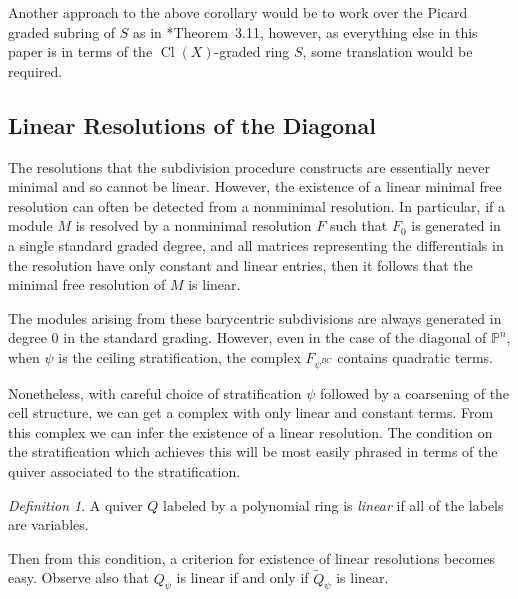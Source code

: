 \documentclass{amsart}
\DeclareMathOperator{\Cl}{Cl}
\theoremstyle{remark}
\newtheorem{definition}[theorem]{Definition}
\begin{document}
Another approach to the above corollary would be to work over the Picard graded subring of $S$ as in \cite{cox-paper}*{Theorem~3.11}, however, as everything else in this paper is in terms of the $\Cl(X)$-graded ring $S$, some translation would be required.

\subsection*{Linear Resolutions of the Diagonal}

The resolutions that the subdivision procedure constructs are essentially never minimal and so cannot be linear.
However, the existence of a linear minimal free resolution can often be detected from a nonminimal resolution.
In particular, if a module $M$ is resolved by a nonminimal resolution $F$ such that $F_0$ is generated in a single standard graded degree,
and all matrices representing the differentials in the resolution have only constant and linear entries,
then it follows that the minimal free resolution of $M$ is linear.

The modules arising from these barycentric subdivisions are always generated in degree $0$ in the standard grading.
However, even in the case of the diagonal of $\mathbb{P}^n$, when $\psi$ is the ceiling stratification, the complex $F_{\psi^{BC}}$ contains quadratic terms.

Nonetheless, with careful choice of stratification $\psi$ followed by a coarsening of the cell structure, we can get a complex with only linear and constant terms.
From this complex we can infer the existence of a linear resolution. The condition on the stratification which achieves this will be most easily phrased in terms of the quiver associated to the stratification.

\begin{definition}
  A quiver $Q$ labeled by a polynomial ring is \emph{linear} if all of the labels are variables.
\end{definition}

Then from this condition, a criterion for existence of linear resolutions becomes easy. Observe also that $Q_\psi$ is linear if and only if $\widetilde{Q}_\psi$ is linear.
\end{document}
